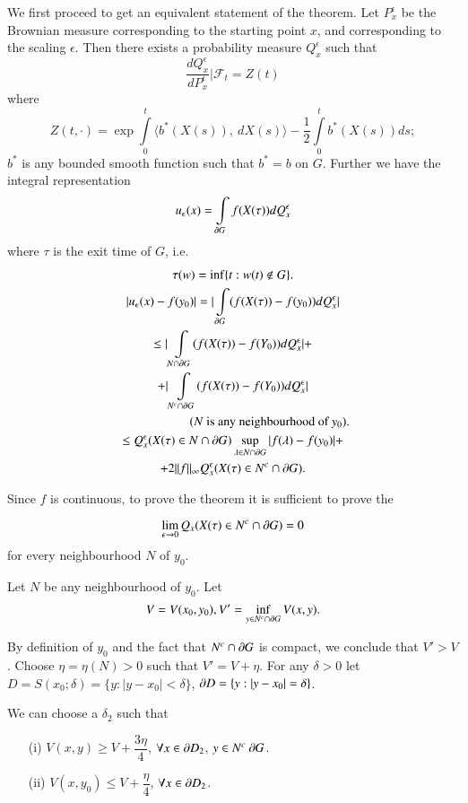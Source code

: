 We first proceed to get an equivalent statement of the theorem. Let
$P^{\epsilon}_{x}$ be the Brownian measure corresponding to the
starting point $x$, and corresponding to the scaling $\epsilon$. Then
there exists a probability measure $Q^{\epsilon}_{x}$ such that
$$
\frac{dQ^{\epsilon}_{x}}{dP^{\epsilon}_{x}}\Big|\mathscr{F}_{t}=Z(t)
$$
where
$$
Z(t,\cdot)=\exp \int\limits^{t}_{0}\langle b^{*}(X(s)),\ dX(s)\rangle
-\frac{1}{2}\int\limits^{t}_{0}b^{*}(X(s)) ds;
$$
$b^{*}$ is any bounded smooth function such that $b^{*}=b$ on
$G$. Further we have the integral representation
$$
u_{\epsilon}(x)=\int\limits_{\partial G}f(X(\tau))dQ^{\epsilon}_{x}
$$
where $\tau$ is the exit time of $G$, i.e.
\begin{gather*}
\tau(w)=\inf \{t:w(t)\not\in G\}.\\
|u_{\epsilon}(x)-f(y_{0})|=|\int\limits_{\partial
  G}(f(X(\tau))-f(y_{0}))dQ^{\epsilon}_{x}|\\
\leq |\int\limits_{N\cap \partial
  G}(f(X(\tau))-f(Y_{0}))dQ^{\epsilon}_{x}|+\\
+|\int\limits_{N^{c}\cap \partial
  G}(f(X(\tau))-f(Y_{0}))dQ^{\epsilon}_{x}|\\
\,\hspace{2cm} (N\text{~ is any neighbourhood of~ } y_{0}).\\
\leq Q^{\epsilon}_{x}(X(\tau)\in N\cap \partial G)\sup\limits_{\lambda \in
  N\cap \partial G}|f(\lambda)-f(y_{0})|+\\
+2||f||_{\infty}Q^{\epsilon}_{x}(X(\tau)\in N^{c}\cap \partial G).
\end{gather*}\pageoriginale

Since $f$ is continuous, to prove the theorem it is sufficient to
prove the

\begin{theorem*}
$$
\lim\limits_{\epsilon\to 0}Q_{x}(X(\tau)\in N^{c}\cap \partial G)=0
$$
for every neighbourhood $N$ of $y_{0}$.
\end{theorem*}

Let $N$ be any neighbourhood of $y_{0}$. Let
$$
V=V(x_{0},y_{0}), V'=\inf\limits_{y\in N^{c}\cap \partial G}V(x,y).
$$

By definition of $y_{0}$ and the fact that $N^{c}\cap \partial G$ is
compact, we conclude that $V'>V$. Choose $\eta=\eta(N)>0$ such that
$V'=V+\eta$. For any $\delta>0$ let
$D=S(x_{0};\delta)=\{y:|y-x_{0}|<\delta\}$, $\partial
D=\{y:|y-x_{0}|=\delta\}$.

\begin{claim*}
We can choose a $\delta_{2}$ such that
\begin{itemize}
\item[(i)] $V(x,y)\geq V+\dfrac{3\eta}{4}$, $\forall x\in \partial D_{2}$,
  $y\in N^{c}\ \partial G$.

\item[(ii)] $V(x,y_{0})\leq V+\dfrac{\eta}{4}$, $\forall x\in \partial D_{2}$.
\end{itemize}
\end{claim*}

